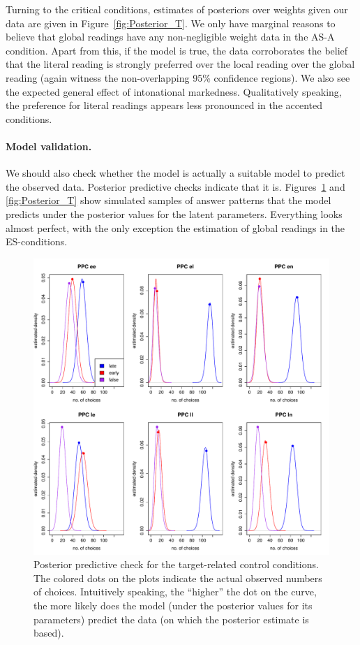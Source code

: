 \documentclass[fleqn,reqno,10pt]{article}
\begin{document}
Turning to the critical conditions, estimates of posteriors over
weights given our data are given in Figure~\ref{fig:Posterior_T}. We
only have marginal reasons to believe that global readings have any
non-negligible weight data in the AS-A condition. Apart from this, if
the model is true, the data corroborates the belief that the literal
reading is strongly preferred over the local reading over the global
reading (again witness the non-overlapping 95\% confidence
regions). We also see the expected general effect of intonational
markedness. Qualitatively speaking, the preference for literal
readings appears less pronounced in the accented conditions.


\paragraph{Model validation.} We should also check whether the model
is actually a suitable model to predict the observed data. Posterior
predictive checks indicate that it is. Figures~\ref{fig:Posterior_TF}
and \ref{fig:Posterior_T} show simulated samples of answer patterns
that the model predicts under the posterior values for the latent
parameters. Everything looks almost perfect, with the only exception
the estimation of global readings in the ES-conditions.

\begin{figure}
  \centering
  \includegraphics[width=\textwidth]{pics/PPC_TF.pdf}
  \caption{Posterior predictive check for the target-related control
    conditions. The colored dots on the plots indicate the actual
    observed numbers of choices. Intuitively speaking, the ``higher''
    the dot on the curve, the more likely does the model (under the
    posterior values for its parameters) predict the data (on which
    the posterior estimate is based).}
  \label{fig:Posterior_TF}
\end{figure}
\end{document}
